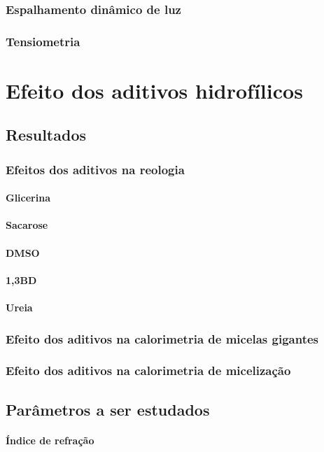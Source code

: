 \documentclass[a4paper, 10pt]{book}
\begin{document}
		\section{Espalhamento dinâmico de luz}
		\section{Tensiometria}
		
\part{Efeito dos aditivos hidrofílicos}
	\chapter{Resultados}
		\section{Efeitos dos aditivos na reologia}
			\subsection{Glicerina}
			\subsection{Sacarose}
			\subsection{DMSO}
			\subsection{1,3BD}
			\subsection{Ureia}
		\section{Efeito dos aditivos na calorimetria de micelas gigantes}
		\section{Efeito dos aditivos na calorimetria de micelização}
	\chapter{Parâmetros a ser estudados}
		\subsection{Índice de refração}
\end{document}
